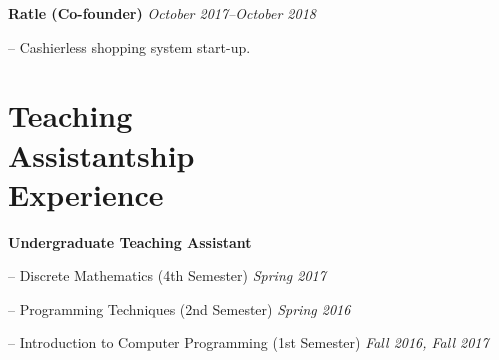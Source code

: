 \documentclass[margin, 10pt]{res}
\newcommand{\field}[2]{\noindent \textbf{#1} \hfill #2 \\}
\begin{document}
\begin{resume}
\field{Ratle (Co-founder)} {\emph{October 2017--October 2018}}
\begin{compactitem}
\item[--] Cashierless shopping system start-up. 
\end{compactitem}


\section{Teaching \\ Assistantship \\ Experience} 
\textbf{Undergraduate Teaching Assistant}
\begin{compactitem}
    \item[--] Discrete Mathematics (4th Semester) \hfill \emph{Spring 2017}
    \item[--] Programming Techniques (2nd Semester) \hfill \emph{Spring 2016}
    \item[--] Introduction to Computer Programming (1st Semester) \hfill \emph{Fall 2016, Fall 2017}
\end{compactitem}





\begin{comment}
\section{Data \\ Analysis \& \\ Visualization \\ Tools} 
\begin{compactitem}
\item[--] Python 
\item[--] Bash 
\item[--] MATLAB 
\item[--] GNU Octave 
\item[--] R
\item[--] Matplotlib 
\item[--] GNUPlot 
\item[--] Pandas
\item[--] Seaborn
\item[--] MySQL 
\item[--] MongoDB 
\end{compactitem}
\end{comment}


\end{resume}
\end{document}
